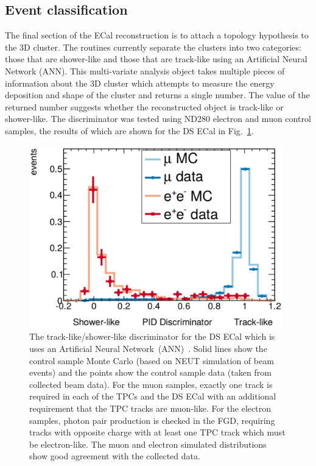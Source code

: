 \subsection{Event classification}
\label{subsec:ECalParticleIdentification}
The final section of the ECal reconstruction is to attach a topology hypothesis to the 3D cluster.  The routines currently separate the clusters into two categories: those that are shower-like and those that are track-like using an Artificial Neural Network (ANN).  This multi-variate analysis object takes multiple pieces of information about the 3D cluster which attempts to measure the energy deposition and shape of the cluster and returns a single number.  The value of the returned number suggests whether the reconstructed object is track-like or shower-like. The discriminator was tested using ND280 electron and muon control samples, the results of which are shown for the DS ECal in Fig.~\ref{fig:ECalTrShVal}.

\begin{figure}
  \centering
  \includegraphics[width=11cm]{images/software/ecal_trshval.pdf}
  \caption{The track-like/shower-like discriminator for the DS ECal which is uses an Artificial Neural Network~(ANN)~\cite{1748-0221-8-10-P10019}.  Solid lines show the control sample Monte Carlo (based on NEUT simulation of beam events) and the points show the control sample data (taken from collected beam data).  For the muon samples, exactly one track is required in each of the TPCs and the DS ECal with an additional requirement that the TPC tracks are muon-like.  For the electron samples, photon pair production is checked in the FGD, requiring tracks with opposite charge with at least one TPC track which must be electron-like.  The muon and electron simulated distributions show good agreement with the collected data.}
  \label{fig:ECalTrShVal}
\end{figure}


